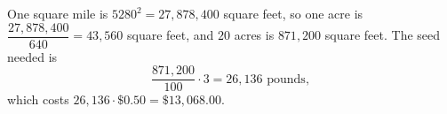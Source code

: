 One square mile is $5280^2=27{,}878{,}400$ square feet, so one acre is $\dfrac{27{,}878{,}400}{640}=43{,}560$ square feet, and $20$ acres is $871{,}200$ square feet. The seed needed is
\[
\dfrac{871{,}200}{100}\cdot3=26{,}136\text{ pounds},
\]
which costs $26{,}136\cdot\$0.50=\boxed{\$13{,}068.00}$.
